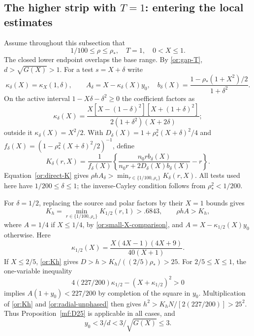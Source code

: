 \subsection{The higher strip with $T=1$: entering the local estimates}

Assume throughout this subsection that
\begin{equation}\label{or:T-domain}
           1/100\le\rho\le\rho_*,\quad T=1,\quad 0<X\le1.
\end{equation}
The closed lower endpoint overlaps the base range.  By
\eqref{or:gap-T}, $d>\sqrt{G(X)}>1$.
For a test $s=X+\delta$ write
\[
 \kappa_\delta(X)=\kappa_X(1,\delta),\qquad
 A_\delta=X-\kappa_\delta(X)y_0,
 \quad b_\delta(X)=\frac{1-\rho_*(1+X^2)/2}{1+\delta^2}.
\]
On the active interval $1-X\delta-\delta^2\ge0$ the coefficient factors as
\begin{equation}\label{or:T-kappa-factor}
 \kappa_\delta(X)=
 \frac{X[X-(1-\delta)^2][X+(1+\delta)^2]}
                 {2(1+\delta^2)(X+2\delta)};
\end{equation}
outside it $\kappa_\delta(X)=X^2/2$.  With
$D_\delta(X)=1+\rho_*^2(X+\delta)^2/4$ and
$f_\delta(X)=(1-\rho_*^2(X+\delta)^2/2)^{-1}$, define
\begin{equation}\label{or:T-source-function}
 K_\delta(r,X)=\frac1{f_\delta(X)}
 \left\{\frac{n_0r b_\delta(X)}{n_0r+2D_\delta(X)b_\delta(X)}-r\right\}.
\end{equation}
Equation~\eqref{or:direct-K} gives
$\rho hA_\delta>\min_{r\in\{1/100,\rho_*\}}K_\delta(r,X)$.
All tests used here have $1/200\le\delta\le1$; the inverse-Cayley
condition follows from $\rho_*^2<1/200$.

For $\delta=1/2$, replacing the source and polar factors by their
$X=1$ bounds gives
\begin{equation}\label{or:Kh}
 K_h=\min_{r\in\{1/100,\rho_*\}}K_{1/2}(r,1)>.6843,
 \qquad \rho h A>K_h,
\end{equation}
where $A=1/4$ if $X\le1/4$, by
\eqref{or:small-X-comparison}, and
$A=X-\kappa_{1/2}(X)y_0$ otherwise.  Here
\[
              \kappa_{1/2}(X)=\frac{X(4X-1)(4X+9)}{40(X+1)}.
\]
If $X\le2/5$, \eqref{or:Kh} gives
$D>h>K_h/((2/5)\rho_*)>25$.
For $2/5\le X\le1$, the one-variable inequality
\begin{equation}\label{or:T-first-square}
            4(227/200)\kappa_{1/2}-(X+\kappa_{1/2})^2>0
\end{equation}
implies $A(1+y_0)<227/200$ by completion of the square in $y_0$.
Multiplication of \eqref{or:Kh} and
\eqref{or:radial-unphased} then gives
$h^2>K_hN/[2(227/200)]>25^2$.
Thus Proposition~\ref{mf:D25} is applicable in all cases, and
\begin{equation}\label{or:T-ratio3}
                  y_0<3/d<3/\sqrt{G(X)}\le3.
\end{equation}

